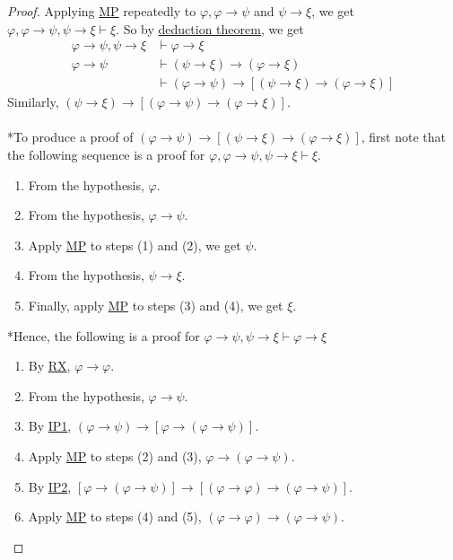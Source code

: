 \documentclass{treatise}
\begin{document}
\begin{proof}
Applying \hyperref[HPL-R-MP]{MP} repeatedly to $\varphi, \varphi \to \psi$ and $\psi \to \xi$, we get $\varphi, \varphi \to \psi, \psi \to \xi \vdash \xi$. So by \hyperref[logic-deduct-metathm]{deduction theorem}, we get
\begin{align*}
    \varphi \to \psi, \psi \to \xi & \vdash \varphi \to \xi
    \\
    \varphi \to \psi & \vdash (\psi \to \xi) \to (\varphi \to \xi)
    \\
    & \vdash (\varphi \to \psi) \to [(\psi \to \xi) \to (\varphi \to \xi)]
\end{align*}
Similarly, $(\psi \to \xi) \to [(\varphi \to \psi) \to (\varphi \to \xi)]$.
\\
\\
*To produce a proof of $(\varphi \to \psi) \to [(\psi \to \xi) \to (\varphi \to \xi)]$, first note that the following sequence is a proof for $\varphi, \varphi \to \psi, \psi \to \xi \vdash \xi$.
\begin{enumerate}
    \item From the hypothesis, $\varphi$.
    \item From the hypothesis, $\varphi \to \psi$.
    \item Apply \hyperref[HPL-R-MP]{MP} to steps (1) and (2), we get $\psi$.
    \item From the hypothesis, $\psi \to \xi$.
    \item Finally, apply \hyperref[HPL-R-MP]{MP} to steps (3) and (4), we get $\xi$.
\end{enumerate}
*Hence, the following is a proof for $\varphi \to \psi, \psi \to \xi \vdash \varphi \to \xi$
\begin{enumerate}
    \item By \hyperref[HPL-T-RX]{RX}, $\varphi \to \varphi$.
    \\
    \item From the hypothesis, $\varphi \to \psi$.
    \item By \hyperref[HPL-A-IP1]{IP1}, $(\varphi \to \psi) \to [\varphi \to (\varphi \to \psi)]$.
    \item Apply \hyperref[HPL-R-MP]{MP} to steps (2) and (3), $\varphi \to (\varphi \to \psi)$.
    \\
    \item By \hyperref[HPL-A-IP2]{IP2}, $[\varphi \to (\varphi \to \psi)] \to [(\varphi \to \varphi) \to (\varphi \to \psi)]$.
    \item Apply \hyperref[HPL-R-MP]{MP} to steps (4) and (5), $(\varphi \to \varphi) \to (\varphi \to \psi)$.

\end{enumerate}
\end{proof}
\end{document}
